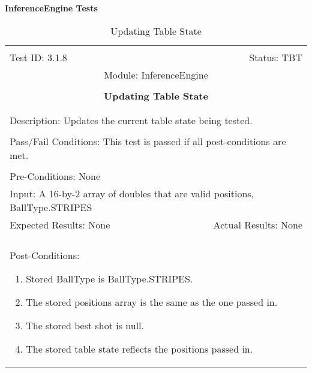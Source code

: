 \documentclass[titlepage]{article}
\begin{document}
\large{\textbf{InferenceEngine Tests}}
\begin{center}%
\begin{table}[h!]
\begin{tabular}{|l r|}\hline&\\[-2mm]
	Test ID: 3.1.8	&Status: TBT\\[-3mm]
	\multicolumn{2}{|c|}{Module: InferenceEngine}\\&\\
	\multicolumn{2}{|c|}{\textbf{\large{Updating Table State}}}\\&\\\hline&\\[-3mm]
	\multicolumn{2}{|p{\textwidth}|}{Description: Updates the current table state being tested.}\\[1mm]\hline&\\[-3mm]
	\multicolumn{2}{|p{\textwidth}|}{Pass/Fail Conditions: This test is passed if all post-conditions are met.}\\[1mm]\hline&\\[-3mm]
	\multicolumn{2}{|p{\textwidth}|}{Pre-Conditions: None}\\[4mm]
	\multicolumn{2}{|p{\textwidth}|}{Input: A 16-by-2 array of doubles that are valid positions, BallType.STRIPES}\\[2mm]\hline
	\multicolumn{1}{|p{0.49\textwidth}}{Expected Results: None}	&\multicolumn{1}{|p{0.45\textwidth}|}{Actual Results: None}\\\hline&\\[-3mm]
	\multicolumn{2}{|p{\textwidth}|}{Post-Conditions: \begin{enumerate}\item Stored BallType is BallType.STRIPES. \item The stored positions array is the same as the one passed in. \item The stored best shot is null. \item The stored table state reflects the positions passed in.\end{enumerate}}\\\hline
\end{tabular}
\caption{Updating Table State}
\end{table}
\end{center}
\end{document}
